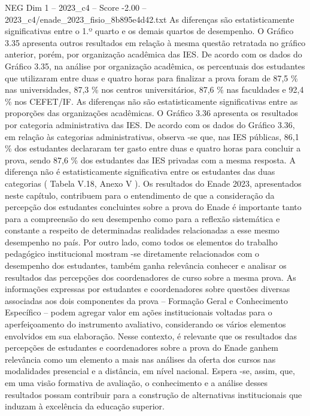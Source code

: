 \begin{textsample}{NEG Dim 1 – 2023\_c4 – Score -2.00 – 2023\_c4/enade\_2023\_fisio\_8b895e4d42.txt}
As diferenças são estatisticamente significativas entre o 1.º quarto e os demais quartos de desempenho.
O Gráfico 3.35 apresenta outros resultados em relação à mesma questão retratada no gráfico anterior, porém, por organização acadêmica das IES.
De acordo com os dados do Gráfico 3.35, na análise por organização acadêmica, os percentuais dos estudantes que utilizaram entre duas e quatro horas para finalizar a prova foram de 87,5 \% nas universidades, 87,3 \% nos centros universitários, 87,6 \% nas faculdades e 92,4 \% nos CEFET/IF.
As diferenças não são estatisticamente significativas entre as proporções das organizações acadêmicas.
O Gráfico 3.36 apresenta os resultados por categoria administrativa das IES.
De acordo com os dados do Gráfico 3.36, em relação às categorias administrativas, observa -se que, nas IES públicas, 86,1 \% dos estudantes declararam ter gasto entre duas e quatro horas para concluir a prova, sendo 87,6 \% dos estudantes das IES privadas com a mesma resposta.
A diferença não é estatisticamente significativa entre os estudantes das duas categorias ( Tabela V.18, Anexo V ).
Os resultados do Enade 2023, apresentados neste capítulo, contribuem para o entendimento de que a consideração da percepção dos estudantes concluintes sobre a prova do Enade é importante tanto para a compreensão do seu desempenho como para a reflexão sistemática e constante a respeito de determinadas realidades relacionadas a esse mesmo desempenho no país.
Por outro lado, como todos os elementos do trabalho pedagógico institucional mostram -se diretamente relacionados com o desempenho dos estudantes, também ganha relevância conhecer e analisar os resultados das percepções dos coordenadores de curso sobre a mesma prova.
As informações expressas por estudantes e coordenadores sobre questões diversas associadas aos dois componentes da prova – Formação Geral e Conhecimento Específico – podem agregar valor em ações institucionais voltadas para o aperfeiçoamento do instrumento avaliativo, considerando os vários elementos envolvidos em sua elaboração.
Nesse contexto, é relevante que os resultados das percepções de estudantes e coordenadores sobre a prova do Enade ganhem relevância como um elemento a mais nas análises da oferta dos cursos nas modalidades presencial e a distância, em nível nacional.
Espera -se, assim, que, em uma visão formativa de avaliação, o conhecimento e a análise desses resultados possam contribuir para a construção de alternativas institucionais que induzam à excelência da educação superior.

\end{textsample}
